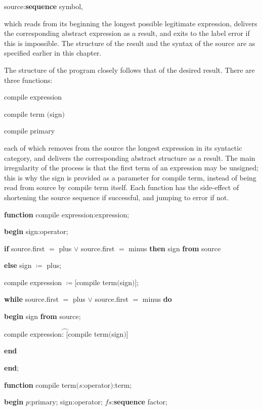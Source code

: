 \quad source:\textbf{sequence} symbol,

\noindent
which reads from its beginning the longest possible legitimate expression, delivers the corresponding abstract expression as a result, and exits to the label error if this is impossible. The structure of the result and the syntax of the source are as specified earlier in this chapter.

The structure of the program closely follows that of the desired result. There are three functions:

\quad compile expression

\quad compile term $($sign$)$

\quad compile primary

\noindent
each of which removes from the source the longest expression in its syntactic category, and delivers the corresponding abstract structure as a result. The main irregularity of the process is that the first term of an expression may be unsigned; this is why the sign is provided as a parameter for compile term, instead of being read from source by compile term itself. Each function has the side-effect of shortening the source sequence if successful, and jumping to error if not.

\noindent
\textbf{function} compile expression:expression;

\noindent
\quad \textbf{begin} sign:operator;

\noindent
\quad \quad \textbf{if} source.first $=$ plus $\vee$ source.first $=$ minus \textbf{then} sign \textbf{from} source

\noindent
\quad \quad \textbf{else} sign $\coloneq$ plus;

\noindent
\quad \quad compile expression $\coloneq [$compile term$($sign$)]$;

\noindent
\quad \quad \textbf{while} source.first $=$ plus $\vee$ source.first $=$ minus \textbf{do}

\noindent
\quad \quad \quad \textbf{begin} sign \textbf{from} source;

\noindent
\quad \quad \quad \quad compile expression$\wideparen{\text{:\ }[}$compile term$($sign$)]$

\noindent
\quad \quad \quad \textbf{end}

\noindent
\quad \textbf{end};

\noindent
\textbf{function} compile term$(s$:operator$)$:term;

\noindent
\quad \textbf{begin} $p$:primary; sign:operator; $fs$:\textbf{sequence} factor;

